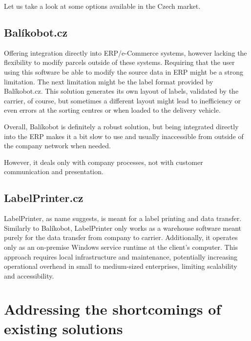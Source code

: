 Let us take a look at some options available in the Czech market.

\subsection{Balíkobot.cz}
\label{subsec:balikobot}
Offering integration directly into ERP/e-Commerce systems, however lacking the flexibility to modify parcels outside of these systems.
Requiring that the user using this software be able to modify the source data in ERP might be a strong limitation.
The next limitation might be the label format provided by Balíkobot.cz.
This solution generates its own layout of labels, validated by the carrier, of course, but sometimes a different layout might lead to inefficiency or even errors at the sorting centres or when loaded to the delivery vehicle.

Overall, Balíkobot is definitely a robust solution, but being integrated directly into the ERP makes it a bit slow to use and usually inaccessible from outside of the company network when needed.

However, it deals only with company processes, not with customer communication and presentation.

\subsection{LabelPrinter.cz}
\label{subsec:labelprinter}
LabelPrinter, as name suggests, is meant for a label printing and data transfer. Similarly to Balíkobot, LabelPrinter only works as a warehouse software meant purely for the data transfer from company to carrier.
Additionally, it operates only as an on-premise Windows service runtime at the client's computer. 
This approach requires local infrastructure and maintenance, potentially increasing operational overhead in small to medium-sized enterprises, limiting scalability and accessibility.


\section{Addressing the shortcomings of existing solutions}
\label{sec:addressing-shortcoming-existing-solutions}

